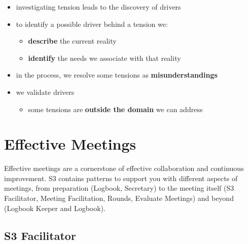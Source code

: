 \begin{itemize}
\item investigating tension leads to the discovery of drivers

\item to identify a possible driver behind a tension we:

\begin{itemize}
\item \textbf{describe} the current reality

\item \textbf{identify} the needs we associate with that reality

\end{itemize}

\item in the process, we resolve some tensions as \textbf{misunderstandings}

\item we validate drivers

\begin{itemize}
\item some tensions are \textbf{outside the domain} we can address

\end{itemize}

\end{itemize}

\chapter{Effective Meetings}
\label{effectivemeetings}

Effective meetings are a cornerstone of effective collaboration and continuous improvement. S3 contains patterns to support you with different aspects of meetings, from preparation (Logbook, Secretary) to the meeting itself (S3 Facilitator, Meeting Facilitation, Rounds, Evaluate Meetings) and beyond (Logbook Keeper and Logbook).

\section{S3 Facilitator}
\label{s3facilitator}

